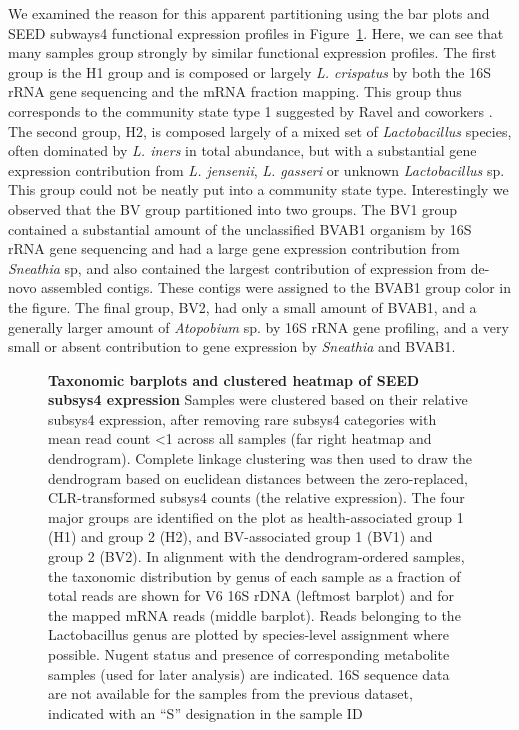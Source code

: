 \documentclass[10pt,letterpaper]{article}
\begin{document}
We examined the reason for this apparent partitioning using the bar plots and SEED subways4 functional expression profiles in Figure~\ref{F2:barplot}.  Here, we can see that many samples group strongly by similar functional expression profiles. The first group is the H1 group and is composed or largely \emph{L. crispatus} by both the 16S rRNA gene sequencing and the mRNA fraction mapping. This group thus corresponds to the community state type 1 suggested by Ravel and coworkers \cite{Ravel:2010}. The second group, H2, is composed largely of a mixed set of \emph{Lactobacillus} species, often dominated by \emph{L. iners} in total abundance, but with a substantial gene expression contribution from \emph{L. jensenii}, \emph{L. gasseri} or unknown \emph{Lactobacillus} sp. This group could not be neatly put into a community state type. Interestingly we observed that the BV group partitioned into two groups. The BV1 group contained a substantial amount of the unclassified BVAB1 organism by 16S rRNA gene sequencing and had a large gene expression contribution from \emph{Sneathia} sp, and also contained the largest contribution of expression from de-novo assembled contigs. These contigs were assigned to the BVAB1 group color in the figure. The final group, BV2, had only a small amount of BVAB1, and a generally larger amount of \emph{Atopobium} sp. by 16S rRNA gene profiling, and a very small or absent contribution to gene expression by \emph{Sneathia} and BVAB1. 


\begin{figure}[h]
\caption{{\bf Taxonomic barplots and clustered heatmap of SEED subsys4 expression}
Samples were clustered based on their relative subsys4 expression, after removing rare subsys4 categories with mean read count <1 across all samples (far right heatmap and dendrogram). Complete linkage clustering was then used to draw the dendrogram based on euclidean distances between the zero-replaced, CLR-transformed subsys4 counts (the relative expression). The four major groups are identified on the plot as health-associated group 1 (H1) and group 2 (H2), and BV-associated group 1 (BV1) and group 2 (BV2). In alignment with the dendrogram-ordered samples, the taxonomic distribution by genus of each sample as a fraction of total reads are shown for V6 16S rDNA (leftmost barplot) and for the mapped mRNA reads (middle barplot). Reads belonging to the Lactobacillus genus are plotted by species-level assignment where possible.  Nugent status and presence of corresponding metabolite samples (used for later analysis) are indicated. 16S sequence data are not available for the samples from the previous dataset, indicated with an “S” designation in the sample ID \cite{macklaim:2013} }
\label{F2:barplot}
\end{figure}
\end{document}
